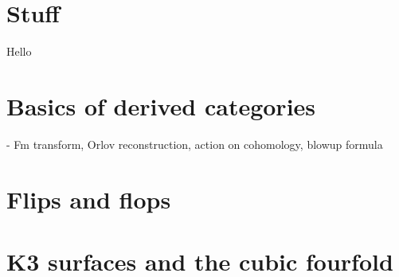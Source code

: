 \section{Stuff}
Hello

\section{Basics of derived categories}
 - Fm transform, Orlov reconstruction, action on cohomology, blowup formula

\section{Flips and flops}

\section{K3 surfaces and the cubic fourfold}

